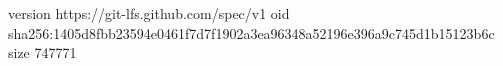 version https://git-lfs.github.com/spec/v1
oid sha256:1405d8fbb23594e0461f7d7f1902a3ea96348a52196e396a9c745d1b15123b6c
size 747771

